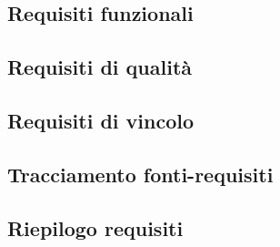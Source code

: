 \documentclass[../AnalisiDeiRequisiti.tex]{subfiles}
\begin{document}
	\subsection{Requisiti funzionali}
	\subsection{Requisiti di qualità}
	\subsection{Requisiti di vincolo}
	\subsection{Tracciamento fonti-requisiti}
	\subsection{Riepilogo requisiti}
	
\end{document}
